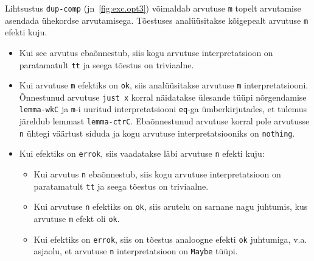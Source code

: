 \documentclass[a4paper,12pt]{article}
\begin{document}
Lihtsustus {\tt dup-comp} (jn~\ref{fig:exc.opt3}) võimaldab arvutuse {\tt m} topelt arvutamise asendada ühekordse arvutamisega.
Tõestuses analüüsitakse kõigepealt arvutuse {\tt m} efekti kuju.
\begin{itemize}
\item Kui see arvutus ebaõnnestub, siis kogu arvutuse interpretatsioon on paratamatult {\tt tt} ja seega tõestus on triviaalne.
\item Kui arvutuse {\tt m} efektiks on {\tt ok}, siis analüüsitakse arvutuse {\tt m} interpretatsiooni. Õnnestunud arvutuse {\tt just x} korral näidatakse ülesande tüüpi nõrgendamise {\tt lemma-wkC} ja {\tt m}-i uuritud interpretatsiooni {\tt eq}-ga ümberkirjutades, et tulemus järeldub lemmast {\tt lemma-ctrC}. Ebaõnnestunud arvutuse korral pole arvutusse {\tt n} ühtegi väärtust siduda ja kogu arvutuse interpretatsiooniks on {\tt nothing}.
\item Kui efektiks on {\tt errok}, siis vaadatakse läbi arvutuse {\tt n} efekti kuju:
  \begin{itemize}
  \item Kui arvutus {\tt n} ebaõnnestub, siis kogu arvutuse interpretatsioon on paratamatult {\tt tt} ja seega tõestus on triviaalne.
  \item Kui arvutuse {\tt n} efektiks on {\tt ok}, siis arutelu on sarnane nagu juhtumis, kus arvutuse {\tt m} efekt oli {\tt ok}.
  \item Kui efektiks on {\tt errok}, siis on tõestus analoogne efekti {\tt ok} juhtumiga, v.a. asjaolu, et arvutuse {\tt n} interpretatsioon on {\tt Maybe} tüüpi.
  \end{itemize}
\end{itemize}
\end{document}
